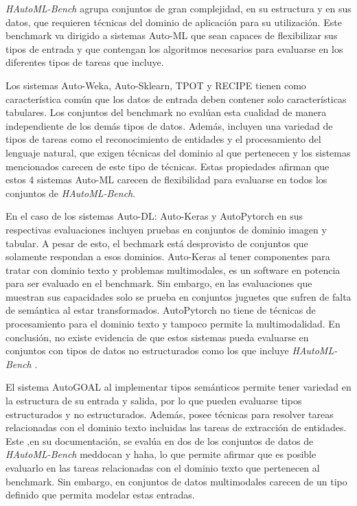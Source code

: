 \textit{HAutoML-Bench} agrupa conjuntos de gran complejidad, en su estructura y en sus datos, que requieren técnicas del dominio de aplicación para su utilización. 
Este benchmark va dirigido a sistemas Auto-ML que sean capaces de flexibilizar sus tipos de entrada 
y que contengan los algoritmos necesarios para evaluarse en los diferentes tipos de tareas que incluye. 

Los sistemas Auto-Weka, Auto-Sklearn, TPOT y RECIPE tienen como característica común que los datos de entrada deben contener solo características tabulares.
Los conjuntos del benchmark no evalúan esta cualidad de manera independiente de los demás tipos de datos. Además, incluyen una variedad de tipos de tareas como 
el reconocimiento de entidades y el procesamiento del lenguaje natural, que exigen técnicas del dominio al que pertenecen y los sistemas mencionados carecen de este tipo 
de técnicas. Estas propiedades afirman que estos 4 sistemas Auto-ML carecen de flexibilidad para evaluarse en todos los conjuntos de \textit{HAutoML-Bench}.

En el caso de los sistemas Auto-DL: Auto-Keras y AutoPytorch en sus respectivas evaluaciones incluyen pruebas en conjuntos de dominio imagen y tabular. 
A pesar de esto, el bechmark está desprovisto de conjuntos que solamente respondan a esos dominios. Auto-Keras al tener componentes para tratar con dominio texto y problemas 
multimodales, es un software en potencia para ser evaluado en el benchmark. Sin embargo, en las evaluaciones que muestran sus capacidades solo se prueba 
en conjuntos juguetes que sufren de falta de semántica al estar transformados. AutoPytorch no tiene de técnicas de procesamiento para el dominio texto y 
tampoco permite la multimodalidad.
En conclusión, no existe evidencia de que estos sistemas pueda evaluarse en conjuntos con tipos de datos no estructurados como los que incluye 
\textit{HAutoML-Bench} . 

El sistema AutoGOAL al implementar tipos semánticos permite tener variedad en la estructura de su entrada y salida, por lo que pueden evaluarse tipos estructurados y no
estructurados. Además, posee técnicas para resolver tareas relacionadas con el dominio texto incluidas las tareas de extracción de entidades. Este ,en su 
documentación, se evalúa en dos de los conjuntos de datos de \textit{HAutoML-Bench} meddocan y haha, lo que permite afirmar que es posible evaluarlo en las tareas 
relacionadas con el dominio texto que pertenecen al benchmark. Sin embargo, en conjuntos de datos multimodales carecen de un tipo definido que permita modelar estas entradas.    

